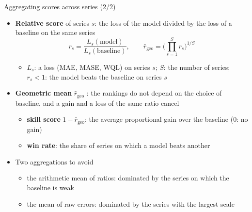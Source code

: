 \begin{frame}{Aggregating scores across series (2/2)}
\itemsize{\small}
\begin{itemize}
    \item \textbf{Relative score} of series $s$: the loss of the model divided by the loss of a baseline on the same series \[ r_s = \frac{L_s(\text{model})}{L_s(\text{baseline})}, \qquad \bar r_{\mathrm{geo}} = \Big(\prod_{s=1}^{S} r_s\Big)^{1/S} \]
    \begin{itemize}
        \item $L_s$: a loss (MAE, MASE, WQL) on series $s$; $S$: the number of series; $r_s < 1$: the model beats the baseline on series $s$
    \end{itemize}
    \item \textbf{Geometric mean} $\bar r_{\mathrm{geo}}$ : the rankings do not depend on the choice of baseline, and a gain and a loss of the same ratio cancel
    \begin{itemize}
        \item \textbf{skill score} $1 - \bar r_{\mathrm{geo}}$: the average proportional gain over the baseline (0: no gain)
        \item \textbf{win rate}: the share of series on which a model beats another
    \end{itemize}
    \item Two aggregations to avoid
    \begin{itemize}
        \item the arithmetic mean of ratios: dominated by the series on which the baseline is weak
        \item the mean of raw errors: dominated by the series with the largest scale
    \end{itemize}
\end{itemize}
\end{frame}

